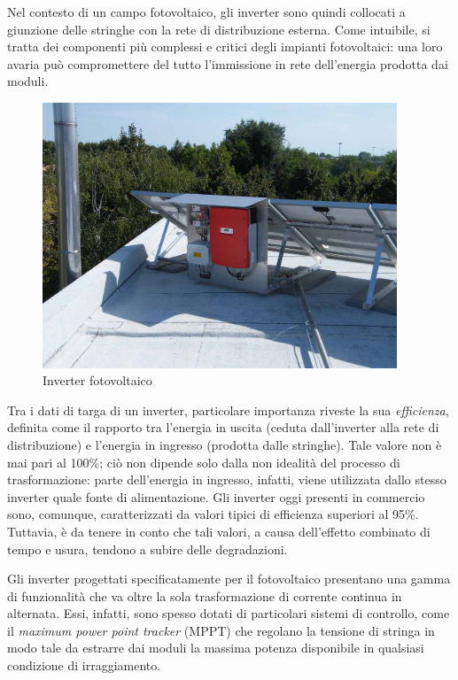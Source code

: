 %
Nel contesto di un campo fotovoltaico, gli inverter sono quindi collocati a 
giunzione delle stringhe con la rete di distribuzione esterna. 
%
Come intuibile, si tratta dei componenti pi\`u complessi e critici degli 
impianti fotovoltaici: una loro avaria pu\`o compromettere del tutto 
l'immissione in rete dell'energia prodotta dai moduli.
%

%
%
\begin{figure}[!h]
\centering
\includegraphics[width=300pt]{img/pv-inverter.jpg}
\caption{Inverter fotovoltaico}
\end{figure}
%
Tra i dati di targa di un inverter, particolare importanza riveste la sua 
\emph{efficienza}, definita come il rapporto tra l'energia in uscita 
(ceduta dall'inverter alla rete di distribuzione) e l'energia in ingresso 
(prodotta dalle stringhe).
%
Tale valore non \`e mai pari al 100\%; ci\`o non dipende solo dalla 
non idealit\`a del processo di trasformazione: parte dell'energia in ingresso, 
infatti, viene utilizzata dallo stesso inverter quale fonte di alimentazione.
%
Gli inverter oggi presenti in commercio sono, comunque, caratterizzati da valori tipici di
efficienza superiori al 95\%. Tuttavia, \`e da tenere in conto che tali valori, 
a causa dell'effetto combinato di tempo e usura, tendono a subire delle degradazioni.
%

%
Gli inverter progettati specificatamente per il fotovoltaico presentano una gamma 
di funzionalit\`a che va oltre la sola trasformazione di corrente continua 
in alternata. Essi, infatti, sono spesso dotati di particolari sistemi di 
controllo, come il \emph{maximum power point tracker} (MPPT) che regolano la tensione 
di stringa in modo tale da estrarre dai moduli la massima potenza disponibile 
in qualsiasi condizione di irraggiamento.
%

